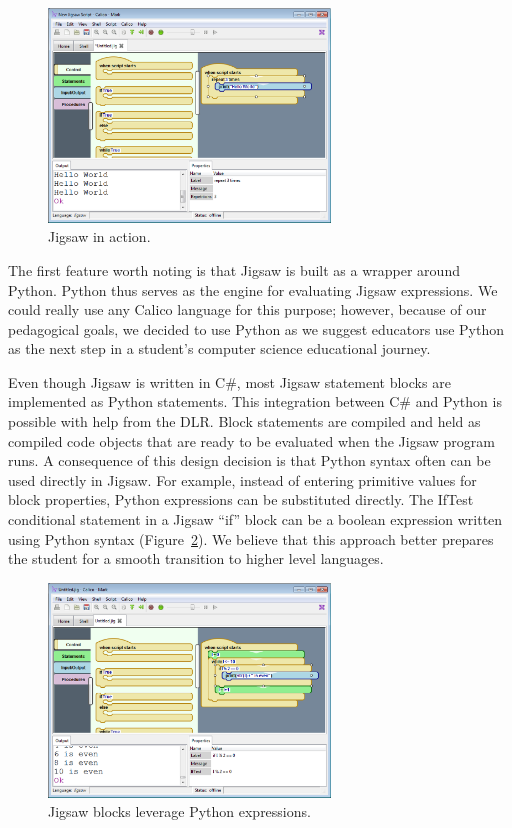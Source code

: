 \documentclass[preprint]{sigplanconf}
\begin{document}
\begin{figure}[h!]
  \centering
     \includegraphics[width=75mm]{jigsaw1.eps}
  \caption{Jigsaw in action.}
  \label{jigsaw1}
\end{figure}

The first feature worth noting is that Jigsaw is built as a wrapper
around Python. Python thus serves as the engine for evaluating Jigsaw
expressions. We could really use any Calico language for this purpose;
however, because of our pedagogical goals, we decided to use Python as
we suggest educators use Python as the next step in a student's
computer science educational journey.

Even though Jigsaw is written in C\#, most Jigsaw statement blocks are
implemented as Python statements. This integration between C\# and
Python is possible with help from the DLR. Block statements are
compiled and held as compiled code objects that are ready to be
evaluated when the Jigsaw program runs. A consequence of this design
decision is that Python syntax often can be used directly in
Jigsaw. For example, instead of entering primitive values for block
properties, Python expressions can be substituted directly. The IfTest
conditional statement in a Jigsaw ``if'' block can be a boolean
expression written using Python syntax (Figure~\ref{jigsaw2}). We
believe that this approach better prepares the student for a smooth
transition to higher level languages.

\begin{figure}[h!]
  \centering
    \includegraphics[width=75mm]{jigsaw2.eps} 
  \caption{Jigsaw blocks leverage Python expressions.}
  \label{jigsaw2}
\end{figure}
\end{document}
